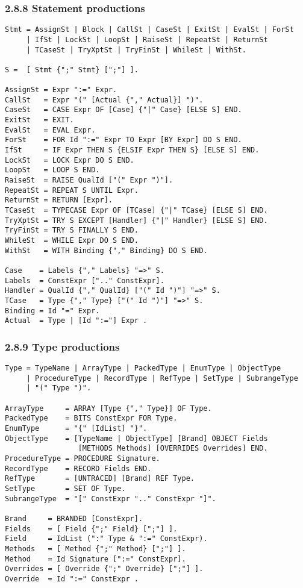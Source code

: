 \documentclass[10pt]{article}
\begin{document}
 
\subsubsection*{2.8.8 Statement productions}


 
\begin{verbatim}
Stmt = AssignSt | Block | CallSt | CaseSt | ExitSt | EvalSt | ForSt 
     | IfSt | LockSt | LoopSt | RaiseSt | RepeatSt | ReturnSt 
     | TCaseSt | TryXptSt | TryFinSt | WhileSt | WithSt.

S =  [ Stmt {";" Stmt} [";"] ].

AssignSt = Expr ":=" Expr.
CallSt   = Expr "(" [Actual {"," Actual}] ")".
CaseSt   = CASE Expr OF [Case] {"|" Case} [ELSE S] END.
ExitSt   = EXIT.
EvalSt   = EVAL Expr.
ForSt    = FOR Id ":=" Expr TO Expr [BY Expr] DO S END.
IfSt     = IF Expr THEN S {ELSIF Expr THEN S} [ELSE S] END.
LockSt   = LOCK Expr DO S END.
LoopSt   = LOOP S END.
RaiseSt  = RAISE QualId ["(" Expr ")"].
RepeatSt = REPEAT S UNTIL Expr.
ReturnSt = RETURN [Expr].
TCaseSt  = TYPECASE Expr OF [TCase] {"|" TCase} [ELSE S] END.
TryXptSt = TRY S EXCEPT [Handler] {"|" Handler} [ELSE S] END.
TryFinSt = TRY S FINALLY S END.
WhileSt  = WHILE Expr DO S END.
WithSt   = WITH Binding {"," Binding} DO S END.

Case    = Labels {"," Labels} "=>" S.
Labels  = ConstExpr [".." ConstExpr].
Handler = QualId {"," QualId} ["(" Id ")"] "=>" S.
TCase   = Type {"," Type} ["(" Id ")"] "=>" S.
Binding = Id "=" Expr.
Actual  = Type | [Id ":="] Expr .
\end{verbatim}



 
\subsubsection*{2.8.9 Type productions}


 
\begin{verbatim}
Type = TypeName | ArrayType | PackedType | EnumType | ObjectType
     | ProcedureType | RecordType | RefType | SetType | SubrangeType
     | "(" Type ")".

ArrayType     = ARRAY [Type {"," Type}] OF Type.
PackedType    = BITS ConstExpr FOR Type.
EnumType      = "{" [IdList] "}".
ObjectType    = [TypeName | ObjectType] [Brand] OBJECT Fields 
                 [METHODS Methods] [OVERRIDES Overrides] END.
ProcedureType = PROCEDURE Signature.
RecordType    = RECORD Fields END.
RefType       = [UNTRACED] [Brand] REF Type.
SetType       = SET OF Type.
SubrangeType  = "[" ConstExpr ".." ConstExpr "]".

Brand     = BRANDED [ConstExpr].
Fields    = [ Field {";" Field} [";"] ].
Field     = IdList (":" Type & ":=" ConstExpr).
Methods   = [ Method {";" Method} [";"] ].
Method    = Id Signature [":=" ConstExpr].
Overrides = [ Override {";" Override} [";"] ].
Override  = Id ":=" ConstExpr .
\end{verbatim}
\end{document}
